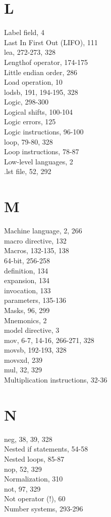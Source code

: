 \documentclass[10pt]{article}
\begin{document}
\section*{L}
Label field, 4\\
Last In First Out (LIFO), 111\\
lea, 272-273, 328\\
Lengthof operator, 174-175\\
Little endian order, 286\\
Load operation, 10\\
lodsb, 191, 194-195, 328\\
Logic, 298-300\\
Logical shifts, 100-104\\
Logic errors, 125\\
Logic instructions, 96-100\\
loop, 79-80, 328\\
Loop instructions, 78-87\\
Low-level languages, 2\\
.lst file, 52, 292

\section*{M}
Machine language, 2, 266\\
macro directive, 132\\
Macros, 132-135, 138\\
64-bit, 256-258\\
definition, 134\\
expansion, 134\\
invocation, 133\\
parameters, 135-136\\
Masks, 96, 299\\
Mnemonics, 2\\
model directive, 3\\
mov, 6-7, 14-16, 266-271, 328\\
movsb, 192-193, 328\\
movsxd, 239\\
mul, 32, 329\\
Multiplication instructions, 32-36

\section*{N}
neg, 38, 39, 328\\
Nested if statements, 54-58\\
Nested loops, 85-87\\
nop, 52, 329\\
Normalization, 310\\
not, 97, 329\\
Not operator (!), 60\\
Number systems, 293-296
\end{document}

